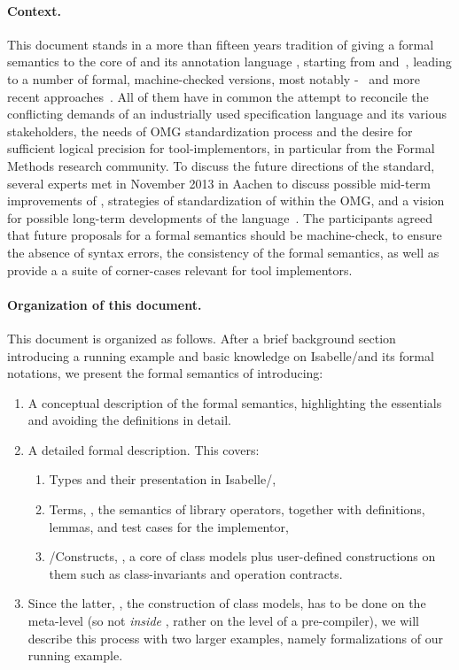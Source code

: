 \paragraph*{Context.} This document stands in a more than fifteen years
tradition of giving a formal semantics to the core of \UML and its
annotation language \OCL, starting from \citet{richters:precise:2002}
and~\cite{hamie.ea:reflections:1998,mandel.ea:ocl:1999,cook.ea::amsterdam:2002},
leading to a number of formal, machine-checked versions, most notably
\HOL-\OCL~\cite{brucker.ea:semantic:2006-b,brucker:interactive:2007,brucker.ea:hol-ocl-book:2006,brucker.ea:extensible:2008-b}
and more recent approaches~\cite{brucker.ea:path-expressions:2013}. All
of them have in common the attempt to reconcile the conflicting
demands of an industrially used specification language and its various
stakeholders, the needs of OMG standardization process and the desire
for sufficient logical precision for tool-implementors, in particular
from the Formal Methods research community.  To discuss the future
directions of the standard, several \OCL experts met in November 2013
in Aachen to discuss possible mid-term improvements of \OCL,
strategies of standardization of \OCL within the OMG, and a vision for
possible long-term developments of the
language~\cite{brucker.ea:summary-aachen:2013}. The participants
agreed that future proposals for a formal semantics should be
machine-check, to ensure the absence of syntax errors, the consistency
of the formal semantics, as well as provide a a suite of corner-cases
relevant for \OCL tool implementors.

\paragraph*{Organization of this document.}
This document is organized as follows. After a brief background section
introducing a running example and basic knowledge on Isabelle/\HOL and its formal
notations, we present the formal semantics of  \FOCL introducing:
\begin{enumerate}
\item A conceptual description of the formal semantics, highlighting the essentials
      and avoiding the definitions in detail.
\item A detailed formal description. This covers:
\begin{enumerate}
\item \OCL Types and their presentation in Isabelle/\HOL,
\item \OCL Terms, \ie, the semantics of library operators,
        together with definitions, lemmas, and test cases for the implementor,
\item \UML/\OCL Constructs, \ie, a core of \UML class models plus user-defined
        constructions on them such as class-invariants and operation contracts.
\end{enumerate}
\item Since the latter, \ie, the construction of \UML class models, has to be done on the meta-level
(so not \emph{inside} \HOL, rather on the level of a pre-compiler), we will describe this process
with two larger examples, namely formalizations of our running example.
\end{enumerate}


